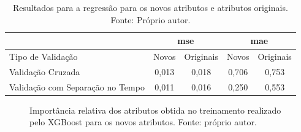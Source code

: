 \begin{table}[h]
\begin{center}
\begin{tabular}{|l|c|c|c|c|}
\cline{2-5}
\multicolumn{1}{l}{}&\multicolumn{2}{|c|}{mse}&\multicolumn{2}{c|}{mae} \\ \hline
Tipo de Validação & Novos & Originais & Novos   & Originais \\ \hline
Validação Cruzada                   & 0,013 & 0,018  & 0,706      & 0,753  \\ \hline
Validação com Separação no Tempo    & 0,011  & 0,016  & 0,250     & 0,553  \\ \hline
\end{tabular}
\end{center}
\vspace{12pt}
\caption{Resultados para a regressão para os novos atributos e atributos originais. Fonte: Próprio autor.}
\label{tab:results_v1_reg}
\end{table}

\begin{figure}[h]
\center
{}
\caption{Importância relativa dos atributos obtida no treinamento realizado pelo XGBoost para os novos atributos. Fonte: próprio autor.}\label{fig:regv1}
\end{figure}

